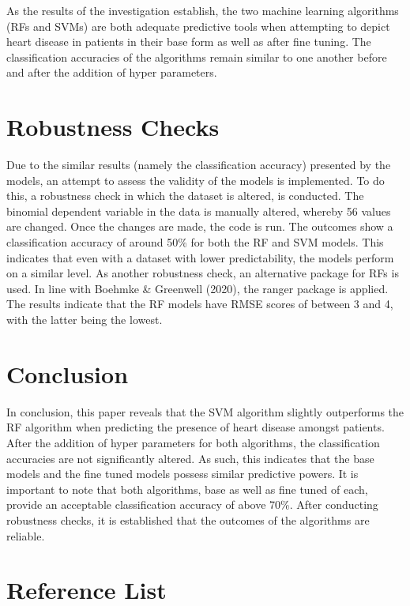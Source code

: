 \documentclass[11pt,preprint, authoryear]{elsarticle}
\numberwithin{equation}{section}
\numberwithin{figure}{section}
\numberwithin{table}{section}
\begin{document}
As the results of the investigation establish, the two machine learning
algorithms (RFs and SVMs) are both adequate predictive tools when
attempting to depict heart disease in patients in their base form as
well as after fine tuning. The classification accuracies of the
algorithms remain similar to one another before and after the addition
of hyper parameters.

\hypertarget{robustness-checks}{%
\section{Robustness Checks}\label{robustness-checks}}

Due to the similar results (namely the classification accuracy)
presented by the models, an attempt to assess the validity of the models
is implemented. To do this, a robustness check in which the dataset is
altered, is conducted. The binomial dependent variable in the data is
manually altered, whereby 56 values are changed. Once the changes are
made, the code is run. The outcomes show a classification accuracy of
around 50\% for both the RF and SVM models. This indicates that even
with a dataset with lower predictability, the models perform on a
similar level. As another robustness check, an alternative package for
RFs is used. In line with Boehmke \& Greenwell (2020), the ranger
package is applied. The results indicate that the RF models have RMSE
scores of between 3 and 4, with the latter being the lowest.

\hypertarget{conclusion}{%
\section{Conclusion}\label{conclusion}}

In conclusion, this paper reveals that the SVM algorithm slightly
outperforms the RF algorithm when predicting the presence of heart
disease amongst patients. After the addition of hyper parameters for
both algorithms, the classification accuracies are not significantly
altered. As such, this indicates that the base models and the fine tuned
models possess similar predictive powers. It is important to note that
both algorithms, base as well as fine tuned of each, provide an
acceptable classification accuracy of above 70\%. After conducting
robustness checks, it is established that the outcomes of the algorithms
are reliable.

\newpage

\hypertarget{reference-list}{%
\section{Reference List}\label{reference-list}}
\end{document}
